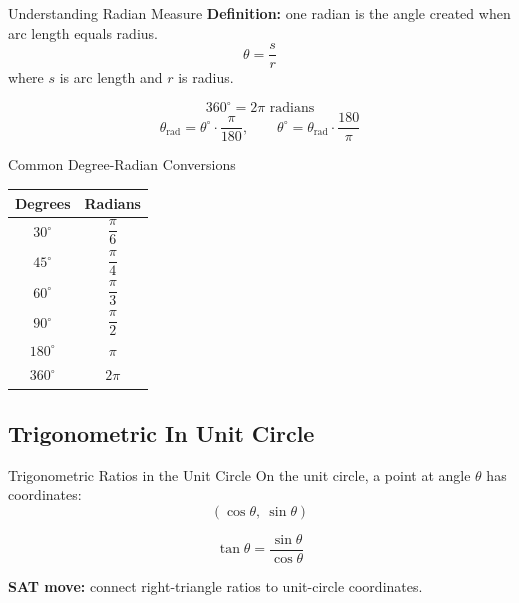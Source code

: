 \documentclass{beamer}
\begin{document}
\begin{frame}{Understanding Radian Measure}
\textbf{Definition:} one radian is the angle created when arc length equals radius.
\[
\theta=\dfrac{s}{r}
\]
where $s$ is arc length and $r$ is radius.

\vspace{0.2cm}
\[
360^\circ=2\pi \text{ radians}
\]
\[
\theta_{\text{rad}}=\theta^\circ\cdot\dfrac{\pi}{180},
\qquad
\theta^\circ=\theta_{\text{rad}}\cdot\dfrac{180}{\pi}
\]
\end{frame}

\begin{frame}{Common Degree-Radian Conversions}
\begin{center}
\begin{tabular}{c|c}
Degrees & Radians \\
\hline
$30^\circ$ & $\dfrac{\pi}{6}$ \\
$45^\circ$ & $\dfrac{\pi}{4}$ \\
$60^\circ$ & $\dfrac{\pi}{3}$ \\
$90^\circ$ & $\dfrac{\pi}{2}$ \\
$180^\circ$ & $\pi$ \\
$360^\circ$ & $2\pi$
\end{tabular}
\end{center}
\end{frame}

\begin{frame}
\section{Trigonometric In Unit Circle}
\end{frame}


\begin{frame}{Trigonometric Ratios in the Unit Circle}
On the unit circle, a point at angle $\theta$ has coordinates:
\[
(\cos\theta,\ \sin\theta)
\]

\vspace{0.2cm}
\[
\tan\theta=\dfrac{\sin\theta}{\cos\theta}
\]

\textbf{SAT move:} connect right-triangle ratios to unit-circle coordinates.
\end{frame}
\end{document}
